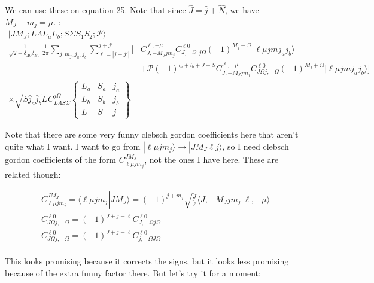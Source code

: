 \documentclass[prl, longbibliography]{revtex4-2}
\begin{document}
We can use these on equation 25. Note that since $\hat{J}=\hat{j}+\hat{N}$, we have $M_J-m_j=\mu$. :
\begin{equation}
\begin{split}
|J M_J; L \Lambda L_a L_b; S \Sigma  S_1 S_2; \mathcal{P} \rangle=\\
\frac{1}{\sqrt{2-\delta_{\Lambda 0}\delta_{\Sigma 0}}}
\frac{1}{2\pi}
\sum_{j, m_j, j_a, j_b} \sum_{\ell=|j-j'|}^{j+j'} \bigg[
&C_{J,-M_J j m_j}^{\ell, -\mu}
C_{J,-\Omega, j \Omega}^{\ell 0}
(-1)^{M_j-\Omega}|\ell\mu j m j_a j_b\rangle\\
&+\mathcal{P}(-1)^{l_a+l_b+J-S}
C_{J,-M_J j m_j}^{\ell, -\mu}
C_{J\Omega j,-\Omega}^{\ell 0}
(-1)^{M_j+\Omega}|\ell\mu j m j_a j_b\rangle\bigg]\\
\times\sqrt{\breve{S}\breve{j_a}\breve{j_b}\breve{L}} 
C_{L \Lambda S \Sigma}^{j \Omega}
\begin{Bmatrix}
L_a & S_a & j_a\\
L_b & S_b & j_b\\
L & S & j
\end{Bmatrix}
\end{split}
\end{equation}

Note that there are some very funny clebsch gordon coefficients here that aren't quite what I want. I want to go from $|\ell\mu jm_j\rangle\rightarrow|J M_J \ell j\rangle$, so I need clebsch gordon coefficients of the form $C_{\ell \mu j m_j}^{J M_J}$, not the ones I have here. These are related though:

\begin{equation}
\begin{split}
C_{\ell \mu j m_j}^{J M_J} = \langle\ell \mu j m_j |J M_J \rangle = (-1)^{j+m_j}\sqrt{\frac{\breve{J}}{\breve{\ell}}}\langle J, -M_J j m_j |\ell, -\mu \rangle\\
C_{J\Omega j,-\Omega}^{\ell 0} = (-1)^{J+j-\ell}C_{J,-\Omega j\Omega}^{\ell 0}\\
C_{J\Omega j,-\Omega}^{\ell 0} = (-1)^{J+j-\ell}C_{j,-\Omega J\Omega}^{\ell 0}\\
\end{split}
\end{equation}

This looks promising because it corrects the signs, but it looks less promising because of the extra funny factor there. But let's try it for a moment:
\end{document}
